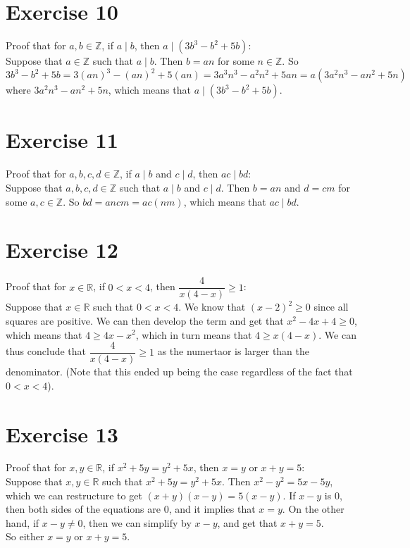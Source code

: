 \documentclass[12pt]{article}
\newcommand{\Z}{\mathbb{Z}}
\newcommand{\R}{\mathbb{R}}
\begin{document}
    \section*{Exercise 10}
    Proof that for $a, b \in \Z$,
    if $a \mid b$,
    then $a \mid (3b^3 - b^2 + 5b)$: \\
    Suppose that $a \in \Z$
    such that $a \mid b$.
    Then $b = an$ for some $n \in \Z$.
    So 
    \[ 3b^3 - b^2 + 5b = 3(an)^3 - (an)^2 + 5(an)
    = 3a^3n^3 - a^2n^2 + 5an = a(3a^2n^3 - an^2 + 5n) \]
    where $3a^2n^3 - an^2 + 5n$,
    which means that $a \mid (3b^3 - b^2 + 5b)$. \\

    \section*{Exercise 11}
    Proof that for $a, b, c, d \in \Z$,
    if $a \mid b$ and $c \mid d$,
    then $ac \mid bd$: \\
    Suppose that $a, b, c, d \in \Z$
    such that $a \mid b$ and $c \mid d$.
    Then $b = an$ and $d = cm$ for some $a, c \in \Z$.
    So $bd = ancm = ac(nm)$,
    which means that $ac \mid bd$. \\

    \section*{Exercise 12}
    Proof that for $x \in \R$,
    if $0 < x < 4$,
    then $\dfrac{4}{x(4-x)} \geqslant 1$: \\
    Suppose that $x \in \R$
    such that $0 < x < 4$.
    We know that $(x-2)^2 \geqslant 0$ since all squares are positive.
    We can then develop the term and get
    that $x^2 - 4x + 4 \geqslant 0$,
    which means that $4 \geqslant 4x - x^2$,
    which in turn means that $4 \geqslant x(4 - x)$.
    We can thus conclude that $\dfrac{4}{x(4-x)} \geqslant 1$
    as the numertaor is larger than the denominator.
    (Note that this ended up being the case
    regardless of the fact that $0 < x < 4$). \\

    \section*{Exercise 13}
    Proof that for $x, y \in \R$,
    if $x^2+5y = y^2+5x$,
    then $x = y$ or $x+y = 5$: \\
    Suppose that $x, y \in \R$
    such that $x^2+5y = y^2+5x$.
    Then $x^2 - y^2 = 5x - 5y$,
    which we can restructure to get $(x+y)(x-y) = 5(x - y)$.
    If $x-y$ is $0$,
    then both sides of the equations are $0$,
    and it implies that $x = y$.
    On the other hand, if $x-y \neq 0$,
    then we can simplify by $x-y$,
    and get that $x+y = 5$. \\
    So either $x = y$ or $x+y = 5$. \\
\end{document}
